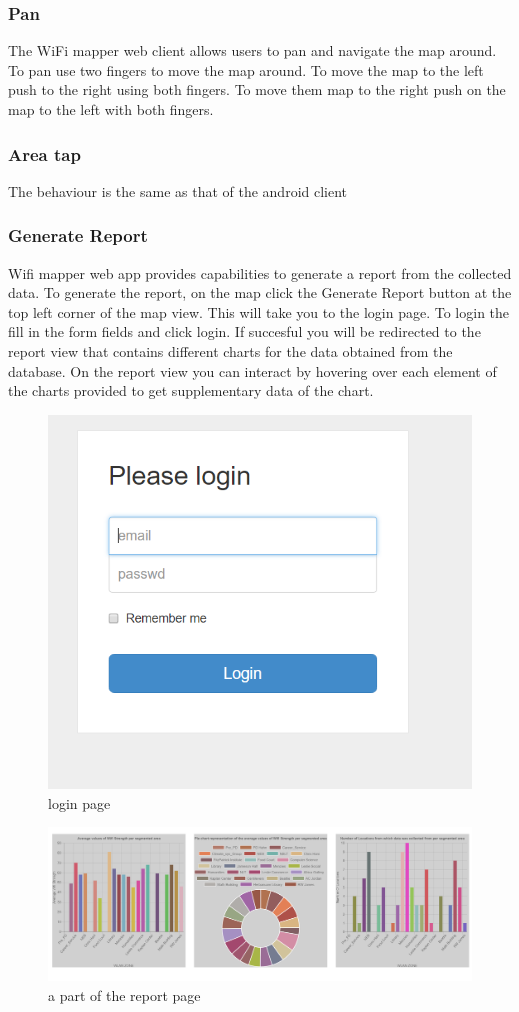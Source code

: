 \subsubsection{Pan}
The WiFi mapper web client allows users to pan and navigate the map around. To pan use two fingers to move the map around. To move the map to the left push to the right using both fingers. To move them map to the right push on the map to the left with both fingers.

\subsubsection{Area tap}
The behaviour is the same as that of the android client


\subsubsection{Generate Report}
Wifi mapper web app provides capabilities to generate a report from the collected data. To generate the report, on the map click the Generate Report button at the top left corner of the map view. This will take you to the login page. To login the fill in the form fields and click login. If succesful you will be redirected to the report view that contains different charts for the data obtained from the database. On the report view you can interact by hovering over each element of the charts provided to get supplementary data of the chart.

\begin{figure}
	\centering
	\includegraphics[width=0.7\linewidth]{images_manual/login}
	\caption{login page}
	\label{fig:login}
\end{figure}

\begin{figure}
	\centering
	\includegraphics[width=0.7\linewidth]{images_manual/report}
	\caption{a part of the report page}
	\label{fig:report}
\end{figure}

